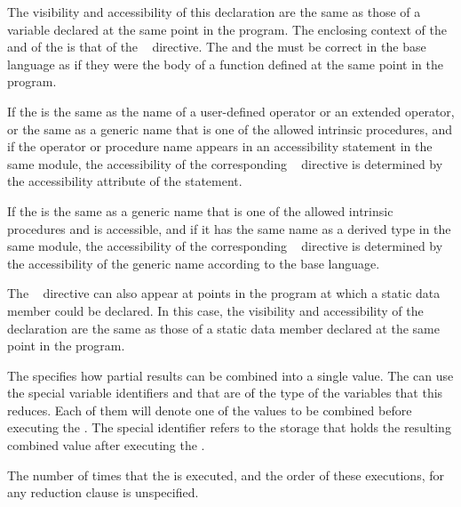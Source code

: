 The visibility and accessibility of this declaration are the same as those 
of a variable declared at the same point in the program. The enclosing context 
of the  and of the  is that of the 
~ directive. The  and the 
 must be correct in the base language as if they were 
the body of a function defined at the same point in the program.

\begin{fortranspecific}
If the  is the same as the name of a user-defined 
operator or an extended operator, or the same as a generic name that is one 
of the allowed intrinsic procedures, and if the operator or procedure name 
appears in an accessibility statement in the same module, the accessibility 
of the corresponding ~ directive is determined 
by the accessibility attribute of the statement.

If the  is the same as a generic name that is one 
of the allowed intrinsic procedures and is accessible, and if it has the same 
name as a derived type in the same module, the accessibility of the corresponding 
~ directive is determined by the accessibility 
of the generic name according to the base language.
\end{fortranspecific}

\begin{cppspecific}
The ~ directive can also appear at points in the 
program at which a static data member could be declared. In this case, the 
visibility and accessibility of the declaration are the same as those of a 
static data member declared at the same point in the program.
\end{cppspecific}

The  specifies how partial results can be combined into a single 
value. The  can use the special variable identifiers  
and  that are of the type of the variables that this 
 reduces. Each of them will denote one of the values to 
be combined before executing the . The special  
identifier refers to the storage that holds the resulting combined value after 
executing the .

The number of times that the  is executed, and the order of these 
executions, for any reduction clause is unspecified.


